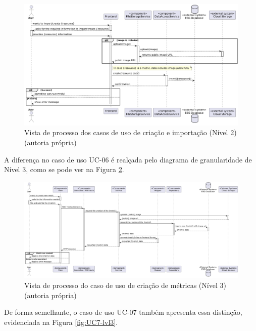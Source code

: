 \begin{figure}[H]
\centering
\includegraphics[width=\linewidth]{frontmatter/assets/diagrams/Process Views/UC67-lvl2.png}
\caption{Vista de processo dos casos de uso de criação e importação (Nível 2) (autoria própria)}
\label{fig:UC67-lvl2}
\end{figure}

A diferença no caso de uso UC-06 é realçada pelo diagrama de granularidade de Nível 3, como se pode ver na Figura \ref{fig:UC6-lvl3}.

\begin{figure}[H]
\centering
\includegraphics[width=\linewidth]{frontmatter/assets/diagrams/Process Views/LVL3/uc-06-lvl3.png}
\caption{Vista de processo do caso de uso de criação de métricas (Nível 3) (autoria própria)}
\label{fig:UC6-lvl3}
\end{figure}

De forma semelhante, o caso de uso UC-07 também apresenta essa distinção, evidenciada na Figura \ref{fig:UC7-lvl3}.

